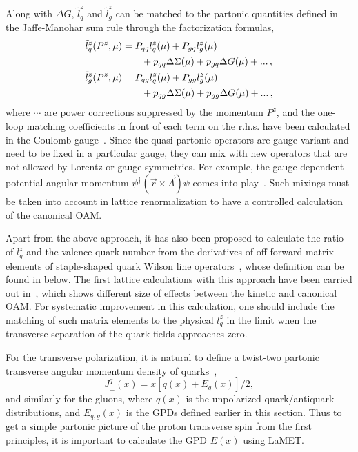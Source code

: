 Along with $\Delta G$,
$\tilde l^z_q$ and $\tilde l^z_g$ can be matched to the partonic
quantities defined in the Jaffe-Manohar sum rule through the factorization formulas,
\begin{align}\label{eq:oammatching}
	\tilde l^z_q(P^z,\mu)  &= P_{qq}  l^z_q(\mu) + P_{gq} l^z_g(\mu) \nonumber\\
	&\qquad+ p_{qq} \Delta \Sigma(\mu) + p_{gq}\Delta G(\mu) + ...\, ,\\
	\tilde l^z_g(P^z,\mu)  &= P_{qg}  l^z_q(\mu) + P_{gg} l^z_g(\mu) \nonumber\\
	&\qquad+ p_{qg} \Delta \Sigma(\mu) + p_{gg}\Delta G(\mu) + ...\, ,
\end{align}
where $\cdots$ are power corrections suppressed by the momentum $P^z$, and the one-loop matching coefficients in front of each term on the r.h.s. have been calculated in the Coulomb gauge~\cite{Ji:2014lra}. Since the quasi-partonic operators are gauge-variant and need to be fixed in a particular gauge, they can mix with new operators that are not allowed by
Lorentz or gauge symmetries. For example,
the gauge-dependent potential angular momentum $\psi^\dagger(\vec{r}\times \vec{A})\psi$
comes into play~\cite{Wakamatsu:2014zza,Ji:2015sio}. Such mixings must be taken into account in lattice renormalization  to have a controlled calculation of the canonical OAM.

Apart from the above approach, it has also been proposed to calculate the ratio of $l_q^z$ and the valence quark number from the derivatives of off-forward matrix elements of staple-shaped quark Wilson line operators~\cite{Engelhardt:2017miy}, whose definition can be found in  below. The first lattice calculations with this approach have been carried out in~\cite{Engelhardt:2017miy,Engelhardt:2019lyy}, which shows different size of effects between the kinetic and canonical OAM. {For systematic improvement in this calculation, one should include the matching of such matrix elements to the physical $l_q^z$ in the limit when the transverse separation of the quark fields approaches zero.}

For the transverse polarization, it is natural to define a twist-two
partonic transverse angular momentum density of quarks~\cite{Hoodbhoy:1998yb,Ji:2012sj,Ji:2020hii,Ji:2020ena},
\begin{equation}
	J^{q}_\perp (x) = x\left[q(x)+ E_q(x)\right]/2,
\end{equation}
and similarly for the gluons, where $q(x)$ is the unpolarized quark/antiquark distributions,
and $E_{q,g}(x)$ is the GPDs defined earlier in this section.
Thus to get a simple partonic picture of the
proton transverse spin from the first principles,
it is important to calculate the GPD $E(x)$ using LaMET.

